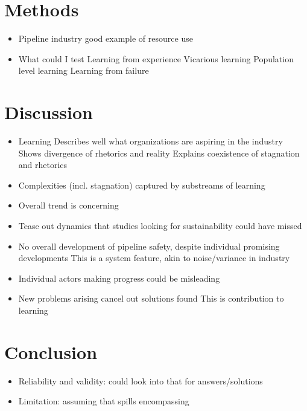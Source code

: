 \documentclass{article}
\begin{document}
	\section{Methods}
	\begin{itemize}
		\item Pipeline industry good example of resource use
		\item What could I test
			\subitem Learning from experience
			\subitem Vicarious learning
			\subitem Population level learning
			\subitem Learning from failure
	\end{itemize}
		
	\section{Discussion}
	\begin{itemize}
		\item Learning
			\subitem Describes well what organizations are aspiring in the industry
			\subitem Shows divergence of rhetorics and reality
			\subitem Explains coexistence of stagnation and rhetorics
		\item Complexities (incl. stagnation) captured by substreams of learning
		\item Overall trend is concerning
		\item Tease out dynamics that studies looking for sustainability could have missed
		\item No overall development of pipeline safety, despite individual promising developments
			\subitem This is a system feature, akin to noise/variance in industry
		\item Individual actors making progress could be misleading
		\item New problems arising cancel out solutions found
			\subitem This is contribution to learning
	\end{itemize}
		
	\section{Conclusion}
	\begin{itemize}
		\item Reliability and validity: could look into that for answers/solutions
		\item Limitation: assuming that spills encompassing
	\end{itemize}



\end{document}
